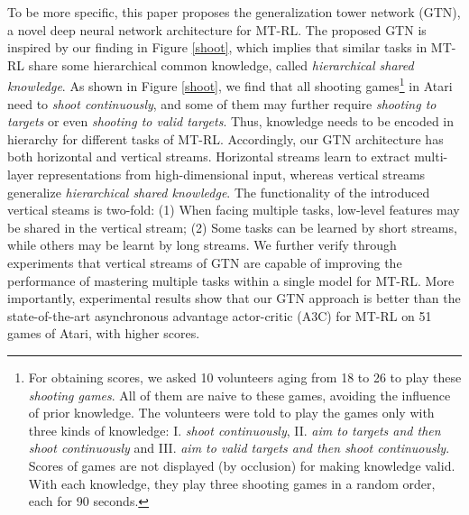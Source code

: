\documentclass[letterpaper]{article} %
\begin{document}
To be more specific, this paper proposes the generalization tower network (GTN), a novel deep neural network architecture for MT-RL.
The proposed GTN is inspired by our finding in Figure \ref{shoot}, which implies that similar tasks in MT-RL share some hierarchical common knowledge, called \textit{hierarchical shared knowledge}.
As shown in Figure \ref{shoot}, we find that all shooting games\footnote{For obtaining scores, we asked 10 volunteers aging from 18 to 26 to play these \textit{shooting games}. All of them are naive to these games, avoiding the influence of prior knowledge. The volunteers were told to play the games only with three kinds of knowledge: I. \textit{shoot continuously}, II. \textit{aim to targets and then shoot continuously} and III. \textit{aim to valid targets and then shoot continuously}. Scores of games are not displayed (by occlusion) for making knowledge valid.  With each knowledge, they play three shooting games in a random order, each for 90 seconds.} in Atari \cite{bellemare2013arcade} need to \textit{shoot continuously}, and some of them may further require \textit{shooting to targets} or even \textit{shooting to valid targets}.
Thus, knowledge needs to be encoded in hierarchy for different tasks of MT-RL.
Accordingly, our GTN architecture has both horizontal and vertical streams.
Horizontal streams learn to extract multi-layer representations from high-dimensional input, whereas vertical streams generalize \textit{hierarchical shared knowledge}.
The functionality of the introduced vertical steams is two-fold: (1) When facing multiple tasks, low-level features may be shared in the vertical stream; (2) Some tasks can be learned by short streams, while others may be learnt by long streams.
We further verify through experiments that vertical streams of GTN are capable of improving the performance of mastering multiple tasks within a single model for MT-RL.
More importantly, experimental results show that our GTN approach is better than the state-of-the-art asynchronous advantage actor-critic (A3C) for MT-RL \cite{romoff2016deep} on 51 games of Atari, with higher scores.
\end{document}
